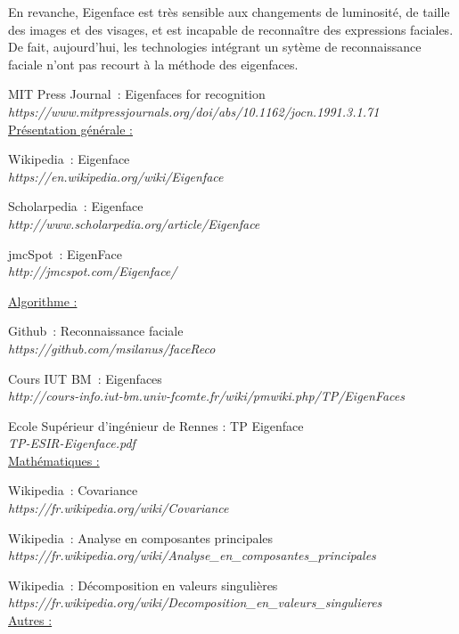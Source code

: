 \documentclass[12pt,french]{article}
\theoremstyle{plain}
\theoremstyle{definition}
\begin{document}
En revanche, Eigenface est très sensible aux changements de luminosité, de taille des images et des visages, et est incapable de reconnaître des expressions faciales.
De fait, aujourd'hui, les technologies intégrant un sytème de reconnaissance faciale n'ont pas recourt à la méthode des eigenfaces.

\newpage
\newpage
\begin{thebibliography}{18}
\bibitem{}
  MIT Press Journal~: Eigenfaces for recognition
  \\\textit{https://www.mitpressjournals.org/doi/abs/10.1162/jocn.1991.3.1.71}
  \\
  \underline{Présentation générale :}

\bibitem{}
  Wikipedia~: Eigenface
  \\\textit{https://en.wikipedia.org/wiki/Eigenface}

\bibitem{}
  Scholarpedia~: Eigenface
  \\\textit{http://www.scholarpedia.org/article/Eigenface}

\bibitem{}
  jmcSpot~: EigenFace
  \\\textit{http://jmcspot.com/Eigenface/}

  \underline{Algorithme :}

\bibitem{}
  Github~: Reconnaissance faciale
  \\\textit{https://github.com/msilanus/faceReco}

\bibitem{}
  Cours IUT BM~: Eigenfaces
  \\\textit{http://cours-info.iut-bm.univ-fcomte.fr/wiki/pmwiki.php/TP/EigenFaces}

\bibitem{}
  Ecole Supérieur d'ingénieur de Rennes : TP Eigenface
  \\\textit{TP-ESIR-Eigenface.pdf}
  \\
  \underline{Mathématiques :}

\bibitem{}
  Wikipedia~: Covariance
  \\\textit{https://fr.wikipedia.org/wiki/Covariance}

\bibitem{}
  Wikipedia~: Analyse en composantes principales
  \\\textit{https://fr.wikipedia.org/wiki/Analyse\_en\_composantes\_principales}

\bibitem{}
  Wikipedia~: Décomposition en valeurs singulières
  \\\textit{https://fr.wikipedia.org/wiki/Decomposition\_en\_valeurs\_singulieres}
  \\
  \underline{Autres :}


\end{thebibliography}
\end{document}
